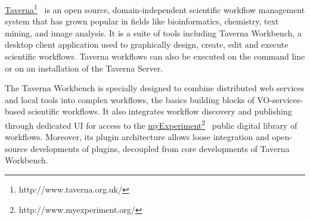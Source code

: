 \documentclass{aa}
\begin{document}
\href{http://www.taverna.org.uk/}{Taverna}\footnote{http://www.taverna.org.uk/}~\citep{Wolstencroft01072013} is an open source, domain-independent scientific workflow management system that has grown popular in fields like bioinformatics, chemistry, text mining, and image analysis. It is a suite of tools including Taverna Workbench, a desktop client application used to graphically design, create, edit and execute scientific workflows. Taverna workflows can also be executed on the command line or on an installation of the Taverna Server.

The Taverna Workbench is specially designed to combine distributed web services and local tools into complex workflows, the basics building blocks of VO-services-based scientific workflows. It also integrates workflow discovery and publishing through dedicated UI for access to the \href{http://www.myexperiment.org/}{myExperiment}\footnote{http://www.myexperiment.org/}~\citep{Goble2010} public digital library of workflows. Moreover, its plugin architecture allows loose integration and open-source developments of plugins, decoupled from core developments of Taverna Workbench.
\end{document}
